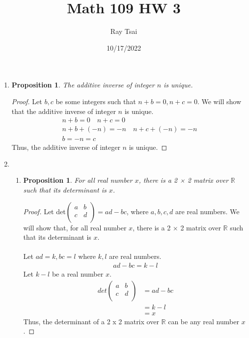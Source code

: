 \documentclass{article}
\title{Math 109 HW 3}
\author{Ray Tsai}
\date{10/17/2022}
\newtheorem{prop}[thm]{Proposition}
\begin{document}
 

\maketitle 

\begin{enumerate}
\item 
\begin{prop}
    The additive inverse of integer $n$ is unique.
\end{prop}
\begin{proof}
Let $b, c$ be some integers such that $n + b = 0, n + c = 0$. We will show that the additive inverse of integer $n$ is unique. 
\begin{gather}
    n + b = 0\quad n + c = 0 \\
    n + b + (-n) = -n\quad n + c + (-n) = -n \\
    b = -n = c
\end{gather}
Thus, the additive inverse of integer $n$ is unique.
\end{proof}

\item \begin{enumerate}
    \item \begin{prop}
     For all real number $x$, there is a 2 × 2 matrix over $\mathbb{R}$ such that its determinant is $x$.
    \end{prop}
    \begin{proof}
    Let det$
        \begin{pmatrix}
            a & b \\
            c & d \\
        \end{pmatrix} = ad - bc$, where $a, b, c ,d$ are real numbers. We will show that, for all real number $x$, there is a 2 × 2 matrix over $\mathbb{R}$ such that its determinant is $x$. \\\\
        Let $ad = k, bc = l$ where $k, l$ are real numbers.
        \begin{align}
            ad - bc = k - l
        \end{align}
        Let $k - l$ be a real number $x$.
        \begin{align}
            det\begin{pmatrix}
            a & b \\
            c & d \\
        \end{pmatrix} &= ad - bc \\ &= k - l \\ &= x
        \end{align}
        Thus, the determinant of a 2 x 2 matrix over $\mathbb{R}$ can be any real number $x$.
    \end{proof}
    

\end{enumerate}
\end{enumerate}
\end{document}
